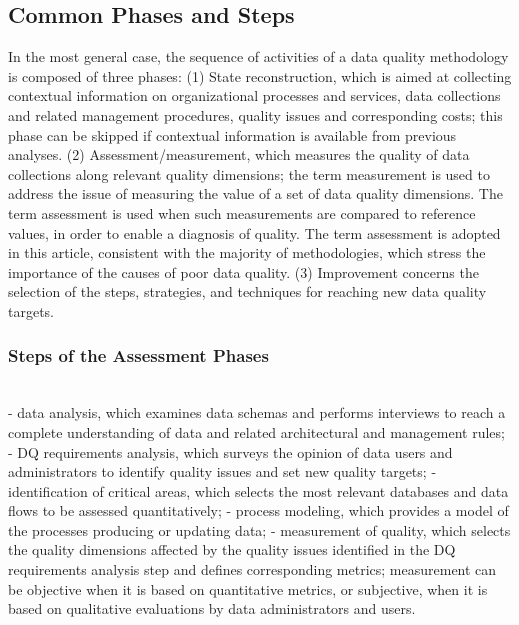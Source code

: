 \documentclass[pdftex,english,oribibl]{llncs}
\begin{document}
\subsection{Common Phases and Steps}
In the most general case, the sequence of activities of a data quality methodology is composed of three phases:
(1) State reconstruction, which is aimed at collecting contextual information on organizational processes and services, data collections and related management procedures, quality issues and corresponding costs; this phase can be skipped if contextual information is available from previous analyses.
(2) Assessment/measurement, which measures the quality of data collections along relevant quality dimensions; the term measurement is used to address the issue of measuring the value of a set of data quality dimensions. The term assessment is used when such measurements are compared to reference values, in order to enable a diagnosis of quality. The term assessment is adopted in this article, consistent with the majority of methodologies, which stress the importance of the causes of poor data quality.
(3) Improvement concerns the selection of the steps, strategies, and techniques for reaching new data quality targets.

\subsubsection{Steps of the Assessment Phases}
\\
- data analysis, which examines data schemas and performs interviews to reach a complete understanding of data and related architectural and management rules;
- DQ requirements analysis, which surveys the opinion of data users and administrators to identify quality issues and set new quality targets;
- identification of critical areas, which selects the most relevant databases and data flows to be assessed quantitatively;
- process modeling, which provides a model of the processes producing or updating data;
- measurement of quality, which selects the quality dimensions affected by the quality issues identified in the DQ requirements analysis step and defines corresponding metrics; measurement can be objective when it is based on quantitative metrics, or subjective, when it is based on qualitative evaluations by data administrators and users.
\end{document}

